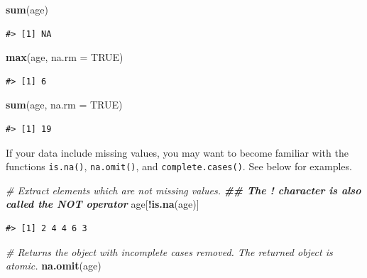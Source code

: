 \documentclass[
]{book}
\newenvironment{Shaded}{\begin{snugshade}}{\end{snugshade}}
\newcommand{\AttributeTok}[1]{\textcolor[rgb]{0.13,0.29,0.53}{#1}}
\newcommand{\CommentTok}[1]{\textcolor[rgb]{0.56,0.35,0.01}{\textit{#1}}}
\newcommand{\ConstantTok}[1]{\textcolor[rgb]{0.56,0.35,0.01}{#1}}
\newcommand{\DocumentationTok}[1]{\textcolor[rgb]{0.56,0.35,0.01}{\textbf{\textit{#1}}}}
\newcommand{\FunctionTok}[1]{\textcolor[rgb]{0.13,0.29,0.53}{\textbf{#1}}}
\newcommand{\NormalTok}[1]{#1}
\newcommand{\SpecialCharTok}[1]{\textcolor[rgb]{0.81,0.36,0.00}{\textbf{#1}}}
\begin{document}
\begin{Shaded}
\begin{Highlighting}[]
\FunctionTok{sum}\NormalTok{(age)}
\end{Highlighting}
\end{Shaded}

\begin{verbatim}
#> [1] NA
\end{verbatim}

\begin{Shaded}
\begin{Highlighting}[]
\FunctionTok{max}\NormalTok{(age, }\AttributeTok{na.rm =} \ConstantTok{TRUE}\NormalTok{)}
\end{Highlighting}
\end{Shaded}

\begin{verbatim}
#> [1] 6
\end{verbatim}

\begin{Shaded}
\begin{Highlighting}[]
\FunctionTok{sum}\NormalTok{(age, }\AttributeTok{na.rm =} \ConstantTok{TRUE}\NormalTok{)}
\end{Highlighting}
\end{Shaded}

\begin{verbatim}
#> [1] 19
\end{verbatim}

If your data include missing values, you may want to become familiar with the
functions \texttt{is.na()}, \texttt{na.omit()}, and \texttt{complete.cases()}. See below for
examples.

\begin{Shaded}
\begin{Highlighting}[]
\CommentTok{\# Extract elements which are not missing values.}
\DocumentationTok{\#\# The ! character is also called the NOT operator}
\NormalTok{age[}\SpecialCharTok{!}\FunctionTok{is.na}\NormalTok{(age)]}
\end{Highlighting}
\end{Shaded}

\begin{verbatim}
#> [1] 2 4 4 6 3
\end{verbatim}

\begin{Shaded}
\begin{Highlighting}[]
\CommentTok{\# Returns the object with incomplete cases removed. The returned object is atomic.}
\FunctionTok{na.omit}\NormalTok{(age)}
\end{Highlighting}
\end{Shaded}
\end{document}
